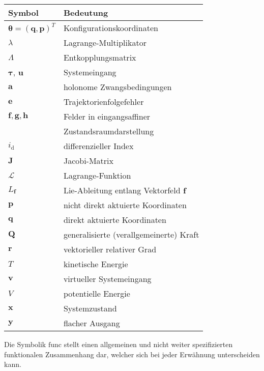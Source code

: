 \begin{table}[htbp]%
	\centering
	\begin{tabular}{ l l } 
		\toprule
		Symbol & Bedeutung \\ 
		\hline
		$\boldsymbol{\theta} = (\mathbf{q}, \mathbf{p})^T$ & Konfigurationskoordinaten \\
		$\lambda$ & Lagrange-Multiplikator \\
		$\Lambda$ & Entkopplungsmatrix \\
		$\boldsymbol{\tau}$, $\mathbf{u}$ & Systemeingang \\
		$\mathbf{a}$ & holonome Zwangsbedingungen \\
		$\mathbf{e}$ & Trajektorienfolgefehler \\
		$\mathbf{f}, \mathbf{g}, \mathbf{h}$ & Felder in eingangsaffiner\\
		& Zustandsraumdarstellung\\
		$i_{\mathrm{d}}$ & differenzieller Index \\
		$\mathbf{J}$ & Jacobi-Matrix \\
		$\mathcal{L}$ & Lagrange-Funktion \\
		$L_{\mathbf{f}}$ & Lie-Ableitung entlang Vektorfeld $\mathbf{f}$\\
		$\mathbf{p}$ & nicht direkt aktuierte Koordinaten \\
		$\mathbf{q}$ & direkt aktuierte Koordinaten \\
		$\mathbf{Q}$ & generalisierte (verallgemeinerte) Kraft\\
		$\mathbf{r}$ & vektorieller relativer Grad \\
		$T$ & kinetische Energie \\
		$\mathbf{v}$ & virtueller Systemeingang \\
		$V$ & potentielle Energie \\
		$\mathbf{x}$ & Systemzustand \\
		$\mathbf{y}$ & flacher Ausgang \\
		\bottomrule
	\end{tabular}
\end{table}

Die Symbolik $\mathrm{func}$ stellt einen allgemeinen und nicht weiter spezifizierten funktionalen Zusammenhang dar, welcher sich bei jeder Erwähnung unterscheiden kann.